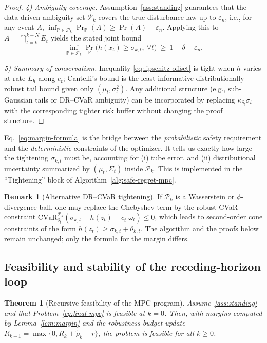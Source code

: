 \documentclass[journal]{IEEEtran}
\newtheorem{theorem}{Theorem}
\theoremstyle{definition}
\newtheorem{remark}{Remark}
\begin{document}
\begin{proof}
\textit{4) Ambiguity coverage.}
Assumption~\ref{ass:standing} guarantees that the data-driven ambiguity set $\mathcal{P}_k$ covers the true disturbance
law up to $\varepsilon_n$, i.e., for any event $A$,
$\inf_{\mathbb{P}\in\mathcal{P}_k}\Pr_{\mathbb{P}}(A)\ge \Pr(A)-\varepsilon_n$.
Applying this to $A=\bigcap_{t=k}^{k+N}E_t$ yields the stated joint bound
\[
\inf_{\mathbb{P}\in\mathcal{P}_k}\Pr_{\mathbb{P}}\!\Big(h(x_t)\ge \sigma_{k,t},\ \forall t\Big)\ \ge\ 1-\delta-\varepsilon_n.
\]

\textit{5) Summary of conservatism.}
Inequality \eqref{eq:lipschitz-offset} is tight when $h$ varies at rate $L_h$ along $e_t$; Cantelli's bound is the least-informative
distributionally robust tail bound given only $(\mu_t,\sigma_t^2)$. Any additional structure (e.g., sub-Gaussian tails or DR--CVaR
ambiguity) can be incorporated by replacing $\kappa_{\delta_t}\sigma_t$ with the corresponding tighter risk buffer without changing
the proof structure.
\end{proof}



Eq.~\eqref{eq:margin-formula} is the bridge between the \emph{probabilistic} safety requirement and the \emph{deterministic} constraints of the optimizer. It tells us exactly how large the tightening $\sigma_{k,t}$ must be, accounting for (i) tube error, and (ii) distributional uncertainty summarized by $(\mu_t,\Sigma_t)$ inside $\mathcal{P}_k$. This is implemented in the ``Tightening'' block of Algorithm~\ref{alg:safe-regret-mpc}.

\begin{remark}[Alternative DR--CVaR tightening]
If $\mathcal{P}_k$ is a Wasserstein or $\phi$-divergence ball, one may replace the Chebyshev term by the robust CVaR constraint $\mathrm{CVaR}^{\mathcal{P}_k}_{\delta_t}(\sigma_{k,t}-h(z_t)-c_t^\top\omega_t)\le 0$, which leads to second-order cone constraints of the form $h(z_t)\ge \sigma_{k,t}+\theta_{k,t}$. The algorithm and the proofs below remain unchanged; only the formula for the margin differs.
\end{remark}

\subsection{Feasibility and stability of the receding-horizon loop}

\begin{theorem}[Recursive feasibility of the MPC program]
\label{thm:feas}
Assume~\ref{ass:standing} and that Problem~\eqref{eq:final-mpc} is feasible at $k=0$. Then, with margins computed by Lemma~\ref{lem:margin} and the robustness budget update $R_{k+1}=\max\{0,R_k+\widetilde\rho_k-\underline r\}$, the problem is feasible for all $k\ge 0$.
\end{theorem}
\end{document}
